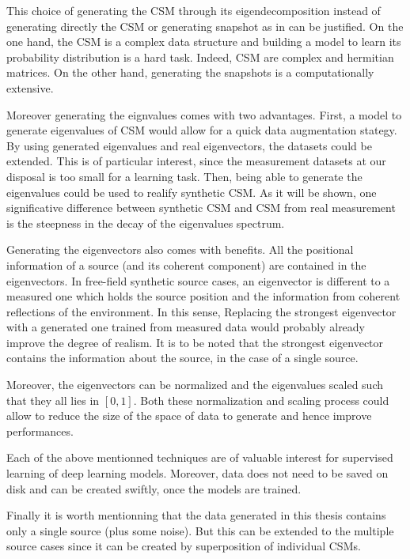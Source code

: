 \documentclass[11pt,a4paper,twoside]{report}
\begin{document}
This choice of generating the CSM through its eigendecomposition instead of generating directly the CSM or generating snapshot as in \cite{gerstoft2020parametric} can be justified. On the one hand, the CSM is a complex data structure and building a model to learn its probability distribution is a hard task. Indeed, CSM are complex and hermitian matrices. On the other hand, generating the snapshots is a computationally extensive.

Moreover generating the eignvalues comes with two advantages. First, a model to generate eigenvalues of CSM would allow for a quick data augmentation stategy. By using generated eigenvalues and real eigenvectors, the datasets could be extended. This is of particular interest, since the measurement datasets at our disposal is too small for a learning task. Then, being able to generate the eigenvalues could be used to realify synthetic CSM. As it will be shown, one significative difference between synthetic CSM and CSM from real measurement is the steepness in the decay of the eigenvalues spectrum.

Generating the eigenvectors also comes with benefits. All the positional information of a source (and its coherent component) are contained in the eigenvectors. In free-field synthetic source cases, an eigenvector is different to a measured one which holds the source position and the information from coherent reflections of the environment. In this sense, Replacing the strongest eigenvector with a generated one trained from measured data would probably already improve the degree of realism. It is to be noted that the strongest eigenvector contains the information about the source, in the case of a single source.

Moreover, the eigenvectors can be normalized and the eigenvalues scaled such that they all lies in $[0,1]$. Both these normalization and scaling process could allow to reduce the size of the space of data to generate and hence improve performances.

Each of the above mentionned techniques are of valuable interest for supervised learning of deep learning models. Moreover, data does not need to be saved on disk and can be created swiftly, once the models are trained. 

Finally it is worth mentionning that the data generated in this thesis contains only a single source (plus some noise). But this can be extended to  the multiple source cases since it can be created by superposition of individual CSMs.
\end{document}

